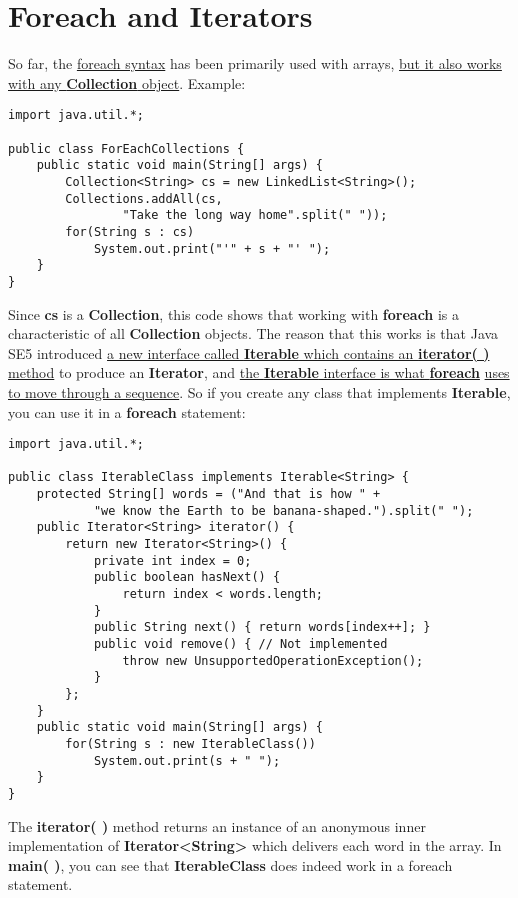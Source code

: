 \documentclass[10pt,letterpaper]{report}
\begin{document}
\section{Foreach and Iterators}
So far, the \underline{foreach syntax} has been primarily used with arrays, \underline{but it also works} \underline{with any \textbf{Collection} object}.
Example:

\begin{lstlisting}
import java.util.*;

public class ForEachCollections {
	public static void main(String[] args) {
		Collection<String> cs = new LinkedList<String>();
		Collections.addAll(cs,
				"Take the long way home".split(" "));
		for(String s : cs)
			System.out.print("'" + s + "' ");
	}
}
\end{lstlisting}

Since \textbf{cs} is a \textbf{Collection}, this code shows that working with \textbf{foreach} is a characteristic of all \textbf{Collection} objects.
The reason that this works is that Java SE5 introduced \underline{a new interface called \textbf{Iterable} which contains an \textbf{iterator( )}} \underline{method} to produce an \textbf{Iterator}, and \underline{the \textbf{Iterable} interface is what \textbf{foreach}} \underline{uses to move through a sequence}. So if you create any class that implements \textbf{Iterable}, you can use it in a \textbf{foreach} statement:

\begin{lstlisting}
import java.util.*;

public class IterableClass implements Iterable<String> {
	protected String[] words = ("And that is how " + 
			"we know the Earth to be banana-shaped.").split(" ");
	public Iterator<String> iterator() {
		return new Iterator<String>() {
			private int index = 0;
			public boolean hasNext() {
				return index < words.length;
			}
			public String next() { return words[index++]; }
			public void remove() { // Not implemented
				throw new UnsupportedOperationException();
			}
		};
	}	
	public static void main(String[] args) {
		for(String s : new IterableClass())
			System.out.print(s + " ");
	}
}
\end{lstlisting}

The \textbf{iterator( )} method returns an instance of an anonymous inner implementation of \textbf{Iterator<String>} which delivers each word in the array. In \textbf{main( )}, you can see that \textbf{IterableClass} does indeed work in a foreach statement.
\end{document}
